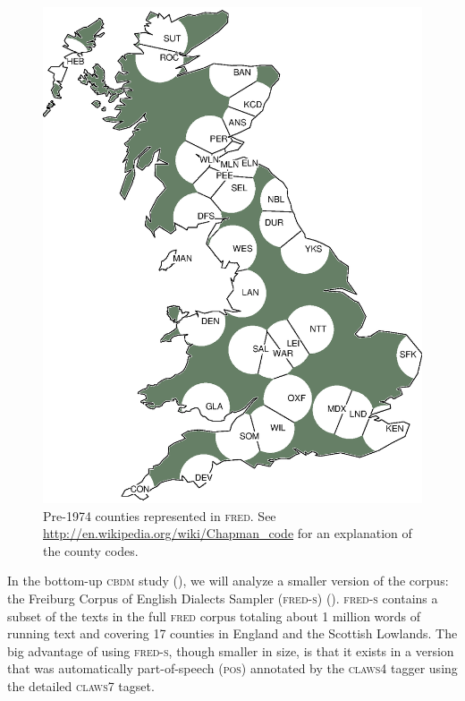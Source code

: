 \documentclass[output=paper]{LSP/langsci}
\begin{document}
\begin{figure}
    \includegraphics [keepaspectratio,width=.8\textwidth] {illustrations/wolk_map_descr_all34_counties.eps}
    \caption{Pre-1974 counties represented in \textsc{fred}. See \url{http://en.wikipedia.org/wiki/Chapman_code} for an explanation of the county codes.}\label{coverage}
\end{figure}


In the bottom-up \textsc{cbdm} study (), we will analyze a smaller version of the corpus: the Freiburg Corpus of English Dialects Sampler (\textsc{fred-s}) (\citealt{szmrecsanyi_manual_2007}). \textsc{fred-s} contains a subset of the texts in the full \textsc{fred} corpus totaling about 1 million words of running text and covering 17 counties in England and the Scottish Lowlands. The big advantage of using \textsc{fred-s}, though smaller in size, is that it exists in a version that was automatically part-of-speech (\textsc{pos}) annotated by the \textsc{claws4} tagger \citep{garside_hybrid_1997} using the detailed \textsc{claws7} tagset.
\end{document}
